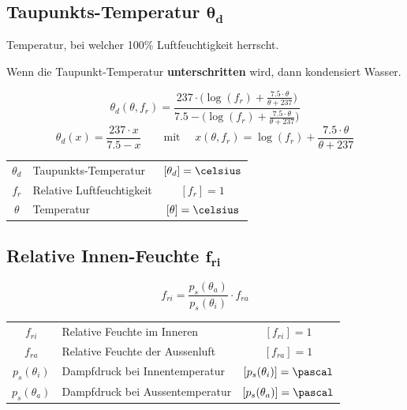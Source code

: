 \subsection[Taupunkts-Temperatur]{Taupunkts-Temperatur $\boldsymbol{\theta_d}$}

Temperatur, bei welcher 100\% Luftfeuchtigkeit herrscht.

\smallskip

Wenn die Taupunkt-Temperatur \textbf{unterschritten} wird, dann kondensiert Wasser.

$$ \boxed{ \theta_d (\theta, f_r) = \frac{237 \cdot \Big( \log(f_r) + \frac{7.5 \cdot \theta}{\theta + 237}    \Big)}{7.5 - \Big( \log(f_r) + \frac{7.5 \cdot \theta }{\theta + 237} \Big) } } $$
$$ \boxed{ \theta_d (x) = \frac{237 \cdot x}{7.5 - x}  \qquad  \text{mit } \quad  x(\theta, f_r) = \log(f_r) + \frac{7.5 \cdot \theta}{\theta + 237} } $$


\begin{tabular}{c l c}
	$\theta_d$	& Taupunkts-Temperatur 		& $[\theta_d] = \celsius$ 	\\
	$f_r$ 		& Relative Luftfeuchtigkeit & $[f_r] = 1$ 				\\
	$\theta$ 	& Temperatur 				& $[\theta] = \celsius$
\end{tabular}


\subsection[Relative Innen-Feuchte]{Relative Innen-Feuchte $\boldsymbol{f_{ri}}$}

\vspace{-0.2cm}

$$ \boxed{ f_{ri} = \frac{p_s(\theta_a)}{p_s(\theta_i)} \cdot f_{ra} } $$

\begin{tabular}{c l c}
	$f_{ri}$ 		& Relative Feuchte im Inneren 		& $[f_{ri}] = 1$ 				\\
	$f_{ra}$ 		& Relative Feuchte der Aussenluft 	& $[f_{ra}] = 1$ 				\\
	$p_s(\theta_i)$ & Dampfdruck bei Innentemperatur 	& $[p_s(\theta_i)] = \pascal$ 	\\
	$p_s(\theta_a)$ & Dampfdruck bei Aussentemperatur 	&  $[p_s(\theta_a)] = \pascal$
\end{tabular}

